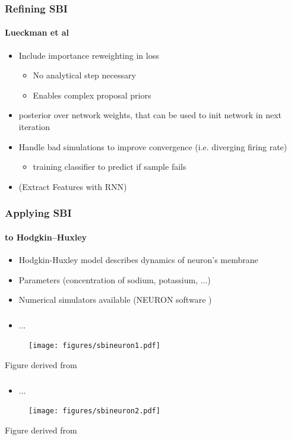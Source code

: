 \documentclass[9pt]{beamer}
\begin{document}
\begin{frame}
\frametitle{Refining SBI}
\framesubtitle{Lueckman et al}
\begin{itemize}
	\item Include importance reweighting in loss
	\begin{itemize}
		\item No analytical step necessary
		\item Enables complex proposal priors
	\end{itemize}
	\item posterior over network weights, that can be used to init network in next iteration
	\item Handle bad simulations to improve convergence (i.e. diverging firing rate)
	\begin{itemize}
		\item training classifier to predict if sample fails
	\end{itemize}
	\item (Extract Features with RNN)
\end{itemize}
\end{frame} 


\begin{frame}
\frametitle{Applying SBI}
\framesubtitle{to Hodgkin–Huxley}
\begin{itemize}
	\item Hodgkin-Huxley model \cite{hodgkin1952quantitative} describes dynamics of neuron's membrane
	\item Parameters (concentration of sodium, potassium, ...)
	\item Numerical simulators available (NEURON software \cite{carnevale2006neuron})
\end{itemize}
\end{frame}  
\begin{frame}
\frametitle{}
\framesubtitle{}
\begin{itemize}
	\item ...
\end{itemize}
\begin{figure}
	\texttt{[image: figures/sbineuron1.pdf]}
\end{figure}
\vspace{50pt}
\tiny Figure derived from \cite{lueckmann2017flexible}
\end{frame}  
\begin{frame}
\frametitle{}
\framesubtitle{}
\begin{itemize}
	\item ...
\end{itemize}
\begin{figure}
	\texttt{[image: figures/sbineuron2.pdf]}
\end{figure}
\vspace{50pt}
\tiny Figure derived from \cite{lueckmann2017flexible}
\end{frame}  
\end{document}
